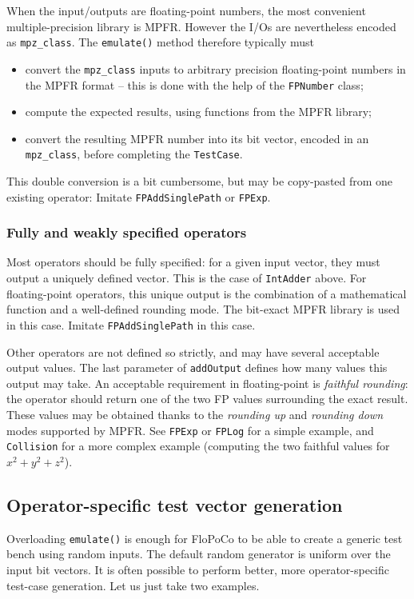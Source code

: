 \documentclass{article}
\begin{document}
When the input/outputs are floating-point numbers, the most convenient multiple-precision library is MPFR. However the I/Os  are nevertheless encoded as \texttt{\small mpz\_class}. The \texttt{\small emulate()} method therefore typically must
\begin{itemize}
\item convert the \texttt{\small mpz\_class} inputs to arbitrary precision floating-point numbers in the MPFR format -- this is done with the help of the \texttt{\small FPNumber} class;
\item compute the expected results, using functions from the MPFR library;
\item convert the resulting MPFR number into its bit vector, encoded in an \texttt{\small mpz\_class}, before completing the \texttt{\small TestCase}. 
\end{itemize}
This double conversion is a bit cumbersome, but may be copy-pasted from one existing operator: Imitate \texttt{\small FPAddSinglePath} or \texttt{\small FPExp}.


\subsubsection{Fully and weakly specified operators}
 Most operators should be fully specified: for a given input
  vector, they must output a uniquely defined vector. This is the case of 
  \texttt{\small IntAdder} above. For floating-point
  operators, this unique output is the combination of a mathematical
  function and a well-defined rounding mode. The bit-exact MPFR
  library is used in this case. Imitate \texttt{\small FPAddSinglePath} in this case.

 Other operators are not defined so strictly, and may have
  several acceptable output values. The last parameter of \texttt{\small addOutput}
  defines how many values this output may take. An acceptable
  requirement in floating-point is \emph{faithful rounding}: the
  operator should return one of the two FP values surrounding the
  exact result. These values may be obtained thanks to the
  \emph{rounding up} and \emph{rounding down} modes supported by
  MPFR. See \texttt{\small FPExp} or \texttt{\small FPLog} for a simple example, and
  \texttt{\small Collision} for a more complex example (computing the two
  faithful values for $x^2+y^2+z^2$).


\subsection{Operator-specific test  vector generation}
Overloading \texttt{\small emulate()} is enough for FloPoCo to be able
to create a generic test bench using random inputs. The default random generator is uniform over the input bit vectors. It is
often possible to perform better, more operator-specific test-case
generation. Let us just take two examples.
\end{document}
